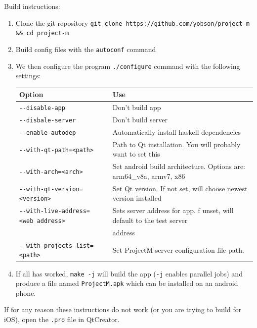 \documentclass{article}
\begin{document}
Build instructions:
\begin{enumerate}
  \item{Clone the git repository \texttt{git clone https://github.com/yobson/project-m && cd project-m}}
  \item{Build config files with the \texttt{autoconf} command}
  \item{We then configure the program \texttt{./configure} command with the following settings:
\begin{longtable}[]{@{}ll@{}}
\toprule
Option & Use\tabularnewline
\midrule
\endhead
\texttt{-\/-disable-app} & Don't build app\tabularnewline
\texttt{-\/-disbale-server} & Don't build server\tabularnewline
\texttt{-\/-enable-autodep} & Automatically install haskell
dependencies\tabularnewline
\texttt{-\/-with-qt-path=\textless{}path\textgreater{}} & Path to Qt
installation. You will probably want to set this\tabularnewline
\texttt{-\/-with-arch=\textless{}arch\textgreater{}} & Set android build
architecture. Options are: arm64\_v8a, armv7, x86\tabularnewline
\texttt{-\/-with-qt-version=\textless{}version\textgreater{}} & Set Qt
version. If not set, will choose newest version installed\tabularnewline
\texttt{-\/-with-live-address=\textless{}web\ address\textgreater{}} &
  Sets server address for app. f unset, will default to the test server \\ & address\tabularnewline
\texttt{-\/-with-projects-list=\textless{}path\textgreater{}} & Set ProjectM
server configuration file path.\tabularnewline
\bottomrule
\end{longtable}
    }
  \item{If all has worked, \texttt{make -j} will build the app (\texttt{-j} enables parallel jobs) and produce a 
    file named \texttt{ProjectM.apk} which can be installed on an android phone.}
\end{enumerate}
If for any reason these instructions do not work (or you are trying to build for iOS), open the \texttt{.pro} file in QtCreator.
\newpage
\end{document}
